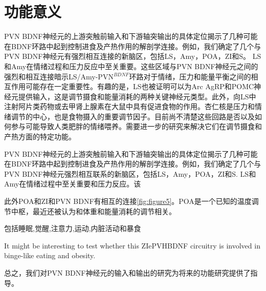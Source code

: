 \section{功能意义}
PVN BDNF神经元的上游突触前输入和下游轴突输出的具体定位揭示了几种可能在BDNF环路中起到控制进食及产热作用的解剖学连接。例如，我们确定了几个与PVN BDNF神经元有强烈相互连接的新脑区，包括LS，Amy，POA，ZI和S。 LS和Amy在情绪过程和压力反应中至关重要\citep{yadin1993role, menard1996lateral}。这些区域与PVN BDNF神经元之间的强烈和相互连接暗示LS/Amy-PVN$^{BDNF}$环路对于情绪，压力和能量平衡之间的相互作用可能存在一定重要性。有趣的是，LS也被证明可以为Arc AgRP和POMC神经元提供输入，这是调节摄食和能量消耗的两种关键神经元类型\citep{wang2015whole}。此外，向LS中注射阿片类药物或去甲肾上腺素在大鼠中具有促进食物的作用\citep{majeed1986stimulation,scopinho2008alpha1}。杏仁核是压力和情绪调节的中心，也是食物摄入的重要调节因子\citep{zhang2011amygdala,cai2014central,douglass2017central}。目前尚不清楚这些回路是否以及如何参与可能导致人类肥胖的情绪喂养\citep{kishi2005body}。需要进一步的研究来解决它们在调节摄食和产热方面的特定功能。

PVN BDNF神经元的上游突触前输入和下游轴突输出的具体定位揭示了几种可能在BDNF环路中起到控制进食及产热作用的解剖学连接。例如，我们确定了几个与PVN BDNF神经元强烈相互联系的新脑区，包括LS，Amy，POA，ZI和S. LS和Amy在情绪过程中至关重要和压力反应\citep{yadin1993role,menard1996lateral}。该



此外POA和ZI和PVN BDNF有相互的连接\figurename{\ref{fig:figure5}}。POA是一个已知的温度调节中枢，最近还被认为和体重和能量消耗的调节相关\citep{morrison2011central,yu2016glutamatergic,zhao2017hypothalamic,tan2018regulation}。

包括睡眠\citep{liu2017lhx6},觉醒\citep{roger1985afferents,power2001evidence},注意力\citep{chometton2017rostromedial,tait2017effects},运动\citep{milner1988electrical,supko1991activation,murer1993circling,perier2002behavioral},内脏活动\citep{huang1974differential,walsh1977some}和暴食\citep{zhang2017rapid}

It might be interesting to test whether this ZIePVHBDNF circuitry is involved in binge-like eating and obesity. 

总之，我们对PVN BDNF神经元的输入和输出的研究为将来的功能研究提供了指导。



